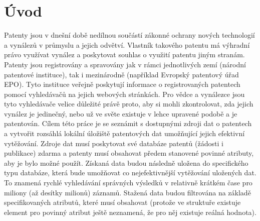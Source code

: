\chapter{Úvod}
Patenty jsou v dnešní době nedílnou součástí zákonné ochrany nových technologií a vynálezů v průmyslu a jejich odvětví. Vlastník takového patentu má výhradní právo využívat vynález a poskytovat souhlas o využití patentu jiným stranám. Patenty jsou registrovány a spravovány jak v rámci jednotlivých zemí (národní patentové instituce), tak i mezinárodně (například Evropský patentový úřad \gls{EPO}). Tyto instituce veřejně poskytují informace o registrovaných patentech pomocí vyhledávačů na jejich webových stránkách. Pro vědce a vynálezce jsou tyto vyhledávače velice důležité právě proto, aby si mohli zkontrolovat, zda jejich vynález je jedinečný, nebo už ve světe existuje v lehce upravené podobě a je patentován.
\newline
\indent Cílem této práce je se seznámit s dostupnými zdroji dat o patentech a vytvořit rozsáhlá lokální úložiště patentových dat umožňující jejich efektivní vytěžování. Zdroje dat musí poskytovat své databáze patentů (žádosti i publikace) zdarma a patenty musí obsahovat předem stanovené povinné atributy, aby je bylo možné použít. Získaná data budou následně uložena do specifického typu databáze, která bude umožňovat co nejefektivnější vytěžování uložených dat. To znamená rychlé vyhledávání správných výsledků v relativně krátkém čase pro miliony (až desítky milionů) záznamů. Stažená data budou filtrována na základě specifikovaných atributů, které musí obsahovat (protože ve struktuře existuje element pro povinný atribut ještě neznamená, že pro něj existuje reálná hodnota).
